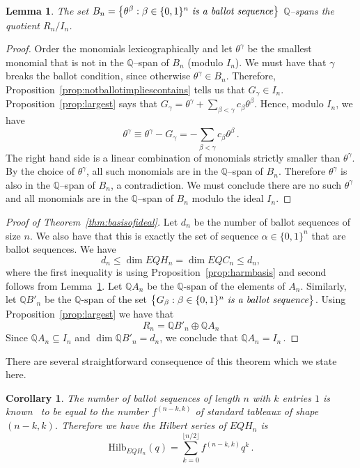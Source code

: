 \documentclass[11pt,oneside]{amsart}
\newtheorem{cor}[theorem]{Corollary}
\newtheorem{lemma}[theorem]{Lemma}
\theoremstyle{definition}
\numberwithin{equation}{section}
\begin{document}
\begin{lemma}\label{lem:spanofquotient}
The set $B_n=\big\{ \theta^\beta : \beta \in \{0,1\}^n \text{ \it is a ballot sequence}\big\}$
$\mathbb Q$--spans the quotient $R_n\big/I_n$.
\end{lemma}

\begin{proof}
Order the monomials lexicographically and let $\theta^\gamma$ be the smallest monomial
that is not in the $\mathbb Q$--span of $B_n$
(modulo  $I_n$). We must have  that $\gamma$ breaks the ballot condition,
since otherwise $\theta^\gamma\in  B_n$. Therefore, Proposition~\ref{prop:notballotimpliescontains}
tells us  that $G_\gamma \in I_n$. Proposition~\ref{prop:largest} says that $G_\gamma = \theta^\gamma + \sum_{\beta<\gamma}  c_\beta \theta^\beta$. Hence, modulo $I_n$, we have
$$ \theta^\gamma \equiv \theta^\gamma - G_\gamma = - \sum_{\beta<\gamma} c_\beta \theta^\beta\,.$$
The right hand side is a linear combination of monomials strictly smaller than $\theta^\gamma$.
By the choice of $\theta^\gamma$, all such monomials are in the $\mathbb Q$--span of $B_n$.
 Therefore $\theta^\gamma$ is also in the $\mathbb Q$--span of $B_n$, a contradiction. We must conclude there are no such $\theta^\gamma$ and all monomials are in the $\mathbb Q$--span of $B_n$ modulo the ideal $I_n$.
\end{proof}

\begin{proof}[Proof of Theorem~\ref{thm:basisofideal}]
Let $d_n$ be the number of ballot sequences of size $n$. We also have that this is exactly the set of sequence $\alpha\in\{0,1\}^n$ that are ballot sequences.
We have
$$ d_n\le \dim EQH_n = \dim EQC_n \le d_n,$$
where the first inequality is using Proposition~\ref{prop:harmbasis} and second follows from Lemma~\ref{lem:spanofquotient}.
Let ${\mathbb Q}A_n$ be the ${\mathbb Q}\text{-span}$ of the elements of $A_n$.
Similarly, let ${\mathbb Q}B'_n$ be the ${\mathbb Q}\text{-span}$ of the set $\big\{ G_\beta : \beta \in \{0,1\}^n \text{ \it is a ballot sequence}\big\}$.
Using Proposition~\ref{prop:largest} we have that
$$R_n ={\mathbb Q}B'_n \oplus  {\mathbb Q}A_n
$$
Since ${\mathbb Q}A_n \subseteq I_n$ and $\dim {\mathbb Q}B'_n = d_n$, we conclude that ${\mathbb Q}A_n = I_n\,.$
\end{proof}

There are several straightforward consequence of this theorem which we state here.

\begin{cor}\label{cor:hilb}  The number of ballot sequences of length $n$ with $k$ entries $1$ is known~\cite{Stanley} to be equal to the number $f^{(n-k,k)}$ of standard tableaux of shape $(n-k,k)$.
Therefore we have  the Hilbert series of $EQH_n$ is
$$  \text{Hilb}_{EQH_n}(q) =  \sum_{k=0}^{\lfloor{n/2}\rfloor} f^{(n-k,k)} q^k\,.$$
\end{cor}
\end{document}
